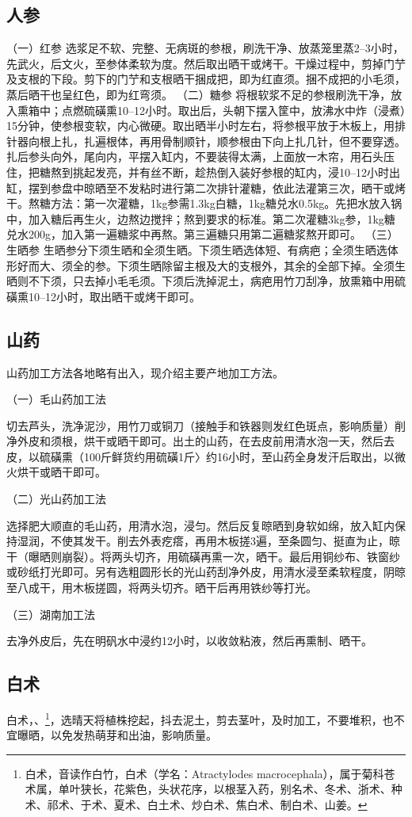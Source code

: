 \documentclass{ctexbook}
\begin{document}
\subsection{人参}
（一）红参
选浆足不软、完整、无病斑的参根，刷洗干净、放蒸笼里蒸2--3小时，先武火，后文火，至参体柔软为度。然后取出晒干或烤干。干燥过程中，剪掉门艼及支根的下段。剪下的门艼和支根晒干捆成把，即为红直须。捆不成把的小毛须，蒸后晒干也呈红色，即为红弯须。
（二）糖参
将根软浆不足的参根刷洗干净，放入熏箱中；点燃硫磺熏10--12小时。取出后，头朝下摆入筐中，放沸水中炸（浸煮）15分钟，使参根变软，内心微硬。取出晒半小时左右，将参根平放于木板上，用排针器向根上扎，扎遍根体，再用骨制顺针，顺参根由下向上扎几针，但不要穿透。扎后参头向外，尾向内，平摆入缸内，不要装得太满，上面放一木帘，用石头压住，把糖熬到挑起发亮，并有丝不断，趁热倒入装好参根的缸内，浸10--12小时出缸，摆到参盘中晾晒至不发粘时进行第二次排针灌糖，依此法灌第三次，晒干或烤干。熬糖方法：第一次灌糖，1kg参需1.3kg白糖，1kg糖兑水0.5kg。先把水放入锅中，加入糖后再生火，边熬边搅拌；熬到要求的标准。第二次灌糖3kg参，1kg糖兑水200g，加入第一遍糖浆中再熬。第三遍糖只用第二遍糖浆熬开即可。
（三）生晒参
生晒参分下须生晒和全须生晒。下须生晒选体短、有病疤；全须生晒选体形好而大、须全的参。下须生晒除留主根及大的支根外，其余的全部下掉。全须生晒则不下须，只去掉小毛毛须。下须后洗掉泥土，病疤用竹刀刮净，放熏箱中用硫磺熏10--12小时，取出晒干或烤干即可。
\subsection{山药}
山药加工方法各地略有出入，现介绍主要产地加工方法。

（一）毛山药加工法

切去芦头，洗净泥沙，用竹刀或铜刀（接触手和铁器则发红色斑点，影响质量）削净外皮和须根，烘干或晒干即可。出土的山药，在去皮前用清水泡一天，然后去皮，以硫磺熏（100斤鲜货约用硫磺1斤〉约16小时，至山药全身发汗后取出，以微火烘干或晒干即可。

（二）光山药加工法

选择肥大顺直的毛山药，用清水泡，浸匀。然后反复晾晒到身软如绵，放入缸内保持湿润，不使其发干。削去外表疙瘩，再用木板搓3遍，至条圆匀、挺直为止，晾干（曝晒则崩裂）。将两头切齐，用硫磺再熏一次，晒干。最后用铜纱布、铁窗纱或砂纸打光即可。另有选粗圆形长的光山药刮净外皮，用清水浸至柔软程度，阴晾至八成干，用木板搓圆，将两头切齐。晒干后再用铁纱等打光。

（三）湖南加工法

去净外皮后，先在明矾水中浸约12小时，以收敛粘液，然后再熏制、晒干。
\subsection{白术}
白术，、\footnote{白术，音读作白竹，白术（学名：Atractylodes macrocephala），属于菊科苍术属，单叶狭长，花紫色，头状花序，以根茎入药，别名术、冬术、浙术、种术、祁术、于术、夏术、白土术、炒白术、焦白术、制白术、山姜。}，选晴天将植株挖起，抖去泥土，剪去茎叶，及时加工，不要堆积，也不宜曝晒，以免发热萌芽和出油，影响质量。
\end{document}
